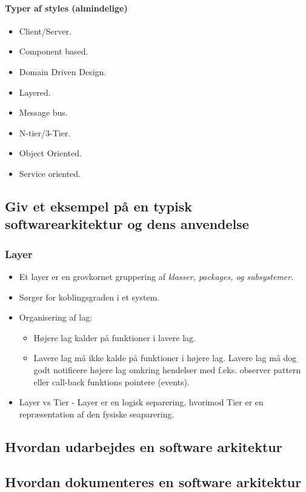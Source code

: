 \paragraph{Typer af styles (almindelige)}
\begin{itemize}
	\item Client/Server.
	\item Component based.
	\item Domain Driven Design.
	\item Layered.
	\item Message bus.
	\item N-tier/3-Tier.
	\item Object Oriented.
	\item Service oriented.
\end{itemize}


\subsection{Giv et eksempel på en typisk softwarearkitektur og dens anvendelse}

\subsubsection{Layer}
\begin{itemize}
	\item Et layer er en grovkornet gruppering af \textit{klasser, packages, og subsystemer}.
	\item Sørger for koblingsgraden i et system.
	\item Organisering af lag:
	\begin{itemize}
		\item Højere lag kalder på funktioner i lavere lag.
		\item Lavere lag må ikke kalde på funktioner i højere lag. Lavere lag må dog godt notificere højere lag omkring hendelser med f.eks. observer pattern eller call-back funktions pointere (events).
	\end{itemize}
	\item Layer vs Tier - Layer er en logisk separering, hvorimod Tier er en repræsentation af den fysiske seaparering.
	
\end{itemize}

\subsection{Hvordan udarbejdes en software arkitektur}

\subsection{Hvordan dokumenteres en software arkitektur}
